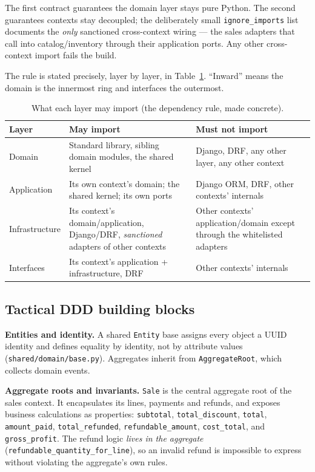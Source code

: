 \documentclass[11pt,a4paper]{article}
\begin{document}
\noindent
The first contract guarantees the domain layer stays pure Python. The second guarantees contexts
stay decoupled; the deliberately small \texttt{ignore\_imports} list documents the \emph{only}
sanctioned cross-context wiring --- the sales adapters that call into catalog/inventory through their
application ports. Any other cross-context import fails the build.

\noindent
The rule is stated precisely, layer by layer, in Table~\ref{tab:imports}. ``Inward'' means the
domain is the innermost ring and interfaces the outermost.

\begin{table}[htbp]\centering
\small
\caption{What each layer may import (the dependency rule, made concrete).}
\label{tab:imports}
\begin{tabular}{@{}p{}p{}p{}@{}}
\toprule
\textbf{Layer} & \textbf{May import} & \textbf{Must not import} \\
\midrule
Domain & Standard library, sibling domain modules, the shared kernel & Django, DRF, any other layer,
any other context \\
Application & Its own context's domain; the shared kernel; its own ports & Django ORM, DRF, other
contexts' internals \\
Infrastructure & Its context's domain/application, Django/DRF, \emph{sanctioned} adapters of other
contexts & Other contexts' application/domain except through the whitelisted adapters \\
Interfaces & Its context's application + infrastructure, DRF & Other contexts' internals \\
\bottomrule
\end{tabular}
\end{table}

\subsection{Tactical DDD building blocks}

\textbf{Entities and identity.} A shared \texttt{Entity} base assigns every object a UUID identity and
defines equality by identity, not by attribute values (\texttt{shared/domain/base.py}). Aggregates
inherit from \texttt{AggregateRoot}, which collects domain events.

\textbf{Aggregate roots and invariants.} \texttt{Sale} is the central aggregate root of the sales
context. It encapsulates its lines, payments and refunds, and exposes business calculations as
properties: \texttt{subtotal}, \texttt{total\_discount}, \texttt{total}, \texttt{amount\_paid},
\texttt{total\_refunded}, \texttt{refundable\_amount}, \texttt{cost\_total}, and
\texttt{gross\_profit}. The refund logic \emph{lives in the aggregate}
(\texttt{refundable\_quantity\_for\_line}), so an invalid refund is impossible to express without
violating the aggregate's own rules.
\end{document}
